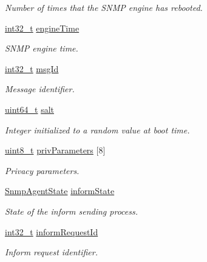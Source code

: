 \begin{DoxyCompactItemize}
\begin{DoxyCompactList}\small\item\em Number of times that the S\+N\+MP engine has rebooted. \end{DoxyCompactList}\item 
\hyperlink{stdint_8h_ab1967d8591af1a4e48c37fd2b0f184d0}{int32\+\_\+t} \hyperlink{struct__SnmpAgentContext_a32903ce1a989d28902b103772ccc22ee}{engine\+Time}
\begin{DoxyCompactList}\small\item\em S\+N\+MP engine time. \end{DoxyCompactList}\item 
\hyperlink{stdint_8h_ab1967d8591af1a4e48c37fd2b0f184d0}{int32\+\_\+t} \hyperlink{struct__SnmpAgentContext_aef6911d86d45747ec920d865078dbad9}{msg\+Id}
\begin{DoxyCompactList}\small\item\em Message identifier. \end{DoxyCompactList}\item 
\hyperlink{stdint_8h_aec6fcb673ff035718c238c8c9d544c47}{uint64\+\_\+t} \hyperlink{struct__SnmpAgentContext_aafefb8fd2674bba56778993656136b0f}{salt}
\begin{DoxyCompactList}\small\item\em Integer initialized to a random value at boot time. \end{DoxyCompactList}\item 
\hyperlink{stdint_8h_aba7bc1797add20fe3efdf37ced1182c5}{uint8\+\_\+t} \hyperlink{struct__SnmpAgentContext_a2acacbc3099bc626c266549a55e4a743}{priv\+Parameters} \mbox{[}8\mbox{]}
\begin{DoxyCompactList}\small\item\em Privacy parameters. \end{DoxyCompactList}\item 
\hyperlink{snmp__agent__inform_8h_aa426c1a6fdbc65cdfa26a178d64371fd}{Snmp\+Agent\+State} \hyperlink{struct__SnmpAgentContext_ac58cd13463c6ca8c8b32a3cf26ba9582}{inform\+State}
\begin{DoxyCompactList}\small\item\em State of the inform sending process. \end{DoxyCompactList}\item 
\hyperlink{stdint_8h_ab1967d8591af1a4e48c37fd2b0f184d0}{int32\+\_\+t} \hyperlink{struct__SnmpAgentContext_a85dbcf7bc8aa295b086b9a9f9c58fab3}{inform\+Request\+Id}
\begin{DoxyCompactList}\small\item\em Inform request identifier. \end{DoxyCompactList}\item 

\end{DoxyCompactItemize}
